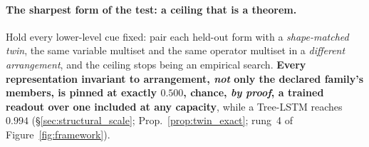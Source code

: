 \paragraph{The sharpest form of the test: a ceiling that is a theorem.} Hold every lower-level cue fixed: pair each held-out form with a \emph{shape-matched twin}, the same variable multiset and the same operator multiset in a \emph{different arrangement}, and the ceiling stops being an empirical search. \textbf{Every representation invariant to arrangement, \emph{not} only the declared family's members, is pinned at exactly $0.500$, chance, \emph{by proof}, a trained readout over one included at any capacity}, while a Tree-LSTM reaches $\mathbf{0.994}$ (\S\ref{sec:structural_scale}; Prop.~\ref{prop:twin_exact}; rung~4 of Figure~\ref{fig:framework}).

